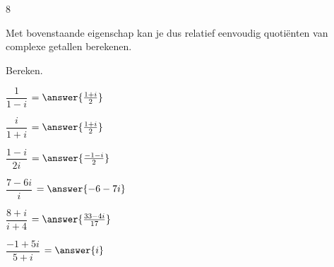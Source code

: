8\documentclass{ximera}
\begin{document}
    Met bovenstaande eigenschap kan je dus relatief eenvoudig quotiënten van complexe getallen berekenen.

    \begin{exercise}
        Bereken.
        \begin{xmmulticols}
        \begin{question} $\dfrac{1}{1-i}$  $= \answer{\frac{1+i}{2}}$
        \end{question}
        \begin{question} $\dfrac{i}{1+i}$ $= \answer{\frac{1+i}{2}}$
        \end{question}
        \begin{question} $\dfrac{1-i}{2i}$ $= \answer{\frac{-1-i}{2}}$
        \end{question}
        \begin{question} $\dfrac{7-6i}{i}$ $= \answer{-6-7i}$
        \end{question}
        \begin{question} $\dfrac{8+i}{i+4}$ $= \answer{\frac{33-4i}{17}}$
        \end{question}
        \begin{question} $\dfrac{-1+5i}{5+i}$ $= \answer{i}$
        \end{question}
    \end{xmmulticols}
    \end{exercise}
        
\end{document}
